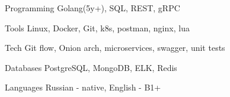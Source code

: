 
\begin{cvskills}

  \cvskill
    {Programming} %
    {Golang(5y+), SQL, REST, gRPC} %

  \cvskill
    {Tools} %
    {Linux, Docker, Git, k8s, postman, nginx, lua} %
    
  \cvskill
    {Tech} %
    {Git flow, Onion arch, microservices, swagger, unit tests} %


  \cvskill
    {Databases} %
    {PostgreSQL, MongoDB, ELK, Redis} %

  \cvskill
    {Languages} %
    {Russian - native, English - B1+ } %

\end{cvskills}
